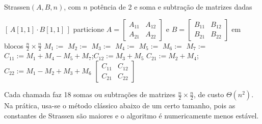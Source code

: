 \begin{pseudo}{Strassen$(A,B,n)$, com $n$ potência de 2 e soma e subtração de matrizes dadas}
\begin{algorithmic}
   \State \Return $[\,A[1,1]\cdot B[1,1]\,]$ \EndIf
  \State particione $A=\begin{bmatrix}A_{11}&A_{12}\\A_{21}&A_{22}\end{bmatrix}$ e $B=\begin{bmatrix}B_{11}&B_{12}\\B_{21}&B_{22}\end{bmatrix}$ em blocos $\frac n2\times\frac n2$
  \State $M_1:=$ 
  \State $M_2:=$ 
  \State $M_3:=$ 
  \State $M_4:=$ 
  \State $M_5:=$ 
  \State $M_6:=$ 
  \State $M_7:=$ 
  \State $C_{11}:=M_1+M_4-M_5+M_7$;\quad $C_{12}:=M_3+M_5$
  \State $C_{21}:=M_2+M_4$;\quad $C_{22}:=M_1-M_2+M_3+M_6$
  \State \Return $\begin{bmatrix}C_{11}&C_{12}\\C_{21}&C_{22}\end{bmatrix}$
\EndFunction
\end{algorithmic}
\end{pseudo}
Cada chamada faz 18 somas ou subtrações de matrizes $\frac n2\times\frac n2$, de custo $\Theta(n^2)$. Na prática, usa-se o método clássico abaixo de um certo tamanho, pois as constantes de Strassen são maiores e o algoritmo é numericamente menos estável.


